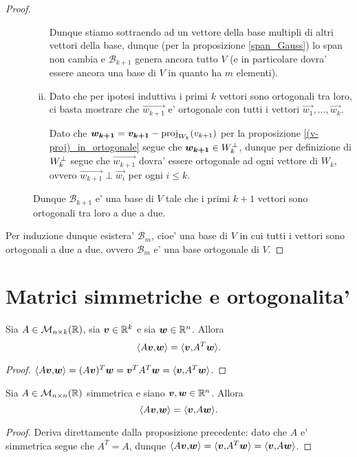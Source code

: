 \begin{proof}
\begin{description}
\begin{enumerate}[(i)]
            Dunque stiamo sottraendo ad un vettore della base multipli di altri vettori della base, dunque (per la proposizione \ref{span_Gauss}) lo span non cambia e $\mathcal{B}_{k+1}$ genera ancora tutto $V$ (e in particolare dovra' essere ancora una base di $V$ in quanto ha $m$ elementi).
            \item Dato che per ipotesi induttiva i primi $k$ vettori sono ortogonali tra loro, ci basta mostrare che $\vec{w_{k+1}}$ e' ortogonale con tutti i vettori $\vec{w_1}, \dots, \vec{w_k}$.
            
            Dato che $\vec{w_{k+1}} = \vec{v_{k+1}} - \proj{v_{k+1}}{W_k}$ per la proposizione \ref{(v-proj)_in_ortogonale} segue che $\vec{w_{k+1}} \in \ortog{W_k}$, dunque per definizione di $\ortog{W_k}$ segue che $\vec{w_{k+1}}$ dovra' essere ortogonale ad ogni vettore di $W_k$, ovvero $\vec{w_{k+1}} \perp \vec{w_i}$ per ogni $i \leq k$.
        \end{enumerate}
        
        Dunque $\mathcal{B}_{k+1}$ e' una base di $V$ tale che i primi $k+1$ vettori sono ortogonali tra loro a due a due.
    \end{description}

    Per induzione dunque esistera' $\mathcal{B}_m$, cioe' una base di $V$ in cui tutti i vettori sono ortogonali a due a due, ovvero $\mathcal{B}_m$ e' una base ortogonale di $V$.
\end{proof}

\section{Matrici simmetriche e ortogonalita'}

\begin{proposition}
    Sia $A \in \M_{n \times k}(\R)$, sia $\vec{v} \in \R^k$ e sia $\vec{w} \in \R^n$. Allora \[
        \innerprod{A\vec v}{\vec w} = \innerprod{\vec v}{A^T\vec w}.    
    \]
\end{proposition}
\begin{proof}
    $\innerprod{A\vec v}{\vec w} = (A\vec v)^T \vec w = {\vec v}^T A^T \vec w = \innerprod{\vec v}{A^T \vec w}$.
\end{proof}

\begin{corollary}
    Sia $A \in \M_{n \times n}(\R)$ simmetrica e siano $\vec v, \vec w \in \R^n$. Allora \[
        \innerprod{A\vec v}{\vec w} = \innerprod{\vec v}{A\vec w}.    
    \]
\end{corollary}
\begin{proof}
    Deriva direttamente dalla proposizione precedente: dato che $A$ e' simmetrica segue che $A^T = A$, dunque $\innerprod{A\vec v}{\vec w} = \innerprod{\vec v}{A^T\vec w} = \innerprod{\vec v}{A\vec w}$.
\end{proof}

